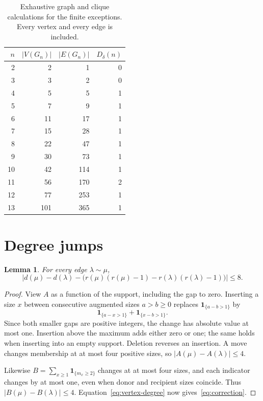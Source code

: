 \documentclass[11pt]{article}
\newtheorem{lemma}[theorem]{Lemma}
\newcommand{\one}{\mathbf{1}}
\begin{document}
\begin{table}[htbp]
\centering
\caption{Exhaustive graph and clique calculations for the finite exceptions.
Every vertex and every edge is included.}\label{tab:small}
\begin{tabular}{rrrr}
\toprule
$n$ & $|V(G_n)|$ & $|E(G_n)|$ & $D_\delta(n)$\\
\midrule
2&2&1&0\\
3&3&2&0\\
4&5&5&1\\
5&7&9&1\\
6&11&17&1\\
7&15&28&1\\
8&22&47&1\\
9&30&73&1\\
10&42&114&1\\
11&56&170&2\\
12&77&253&1\\
13&101&365&1\\
\bottomrule
\end{tabular}
\end{table}

\section{Degree jumps}

\begin{lemma}\label{lem:correction}
For every edge $\lambda\sim\mu$,
\begin{equation}\label{eq:correction}
 \left|d(\mu)-d(\lambda)
 -\bigl(r(\mu)(r(\mu)-1)-r(\lambda)(r(\lambda)-1)\bigr)\right|\leq8.
\end{equation}
\end{lemma}
\begin{proof}
View $A$ as a function of the support, including the gap to zero.
Inserting a size $x$ between consecutive augmented sizes $a>b\geq0$
replaces $\one_{\{a-b>1\}}$ by
\[
 \one_{\{a-x>1\}}+\one_{\{x-b>1\}}.
\]
Since both smaller gaps are positive integers, the change has absolute
value at most one. Insertion above the maximum adds either zero or one;
the same holds when inserting into an empty support. Deletion reverses
an insertion. A move changes membership at at most four positive sizes,
so $|A(\mu)-A(\lambda)|\leq4$.

Likewise $B=\sum_{x\geq1}\one_{\{m_x\geq2\}}$ changes at at most four
sizes, and each indicator changes by at most one, even when donor and
recipient sizes coincide. Thus $|B(\mu)-B(\lambda)|\leq4$.
Equation~\eqref{eq:vertex-degree} now gives~\eqref{eq:correction}.
\end{proof}
\end{document}
